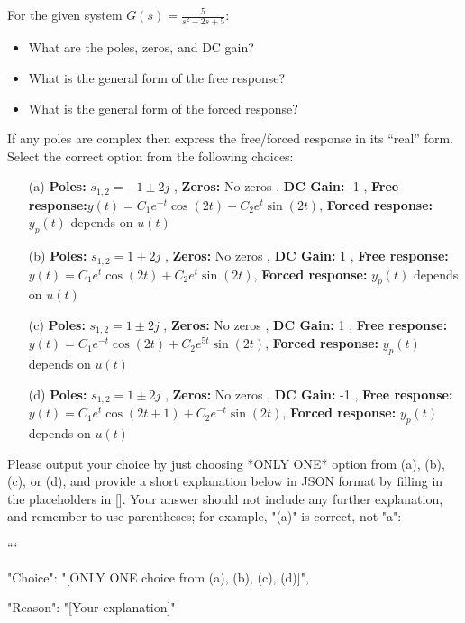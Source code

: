 \documentclass[12pt]{article}
\begin{document}
For the given system \(G(s) = \frac{5}{s^2-2s+5}\):
\begin{itemize}
    \item  What are the poles, zeros, and DC gain?
    \item  What is the general form of the free response?
    \item  What is the general form of the forced response? 
\end{itemize}
If any poles are complex then express the free/forced response in its “real” form.
Select the correct option from the following choices:
\begin{enumerate}
    \item [(a)] \textbf{Poles:} \(s_{1,2} = -1 \pm 2j\) , \textbf{Zeros:} No zeros , \textbf{DC Gain:} -1 , \textbf{Free response:}\(y(t) = C_1 e^{-t} \cos(2t) + C_2 e^{t} \sin(2t)\), \textbf{Forced response:} \(y_p(t)\) depends on \(u(t)\)
    
    \item [(b)] \textbf{Poles:} \(s_{1,2} = 1 \pm 2j\) , \textbf{Zeros:} No zeros , \textbf{DC Gain:} 1 , \textbf{Free response:}\(y(t) = C_1 e^{t} \cos(2t) + C_2 e^{t} \sin(2t)\), \textbf{Forced response:} \(y_p(t)\) depends on \(u(t)\)
    
    \item [(c)] \textbf{Poles:} \(s_{1,2} = 1 \pm 2j\) , \textbf{Zeros:} No zeros , \textbf{DC Gain:} 1 , \textbf{Free response:}\(y(t) = C_1 e^{-t} \cos(2t) + C_2 e^{5t} \sin(2t)\), \textbf{Forced response:} \(y_p(t)\) depends on \(u(t)\)
    
    \item [(d)] \textbf{Poles:} \(s_{1,2} = 1 \pm 2j\) , \textbf{Zeros:} No zeros , \textbf{DC Gain:} -1 , \textbf{Free response:}\(y(t) = C_1 e^{t} \cos(2t+1) + C_2 e^{-t} \sin(2t)\), \textbf{Forced response:} \(y_p(t)\) depends on \(u(t)\)
\end{enumerate}


Please output your choice by just choosing *ONLY ONE* option from (a), (b), (c), or (d), and provide a short explanation below in JSON format by filling in the placeholders in []. Your answer should not include any further explanation, and remember to use parentheses; for example, "(a)" is correct, not "a": 

```
{

"Choice": "[ONLY ONE choice from (a), (b), (c), (d)]",

"Reason": "[Your explanation]"

}
\end{document}
